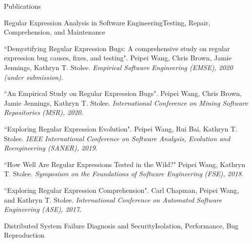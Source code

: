 \documentclass{professional} %
\begin{document}
\begin{rSection}{Publications} 
\begin{rSubsection}{Regular Expression Analysis in Software Engineering}{Testing, Repair, Comprehension, and Maintenance} \\

\item ``Demystifying Regular Expression Bugs: A comprehensive study on regular expression bug causes, fixes, and testing". Peipei Wang, Chris Brown, Jamie Jennings, Kathryn T. Stolee. \textit{Empirical Software Engineering (EMSE), 2020 (under submission)}.

\item ``An Empirical Study on Regular Expression Bugs". Peipei Wang, Chris Brown, Jamie Jennings, Kathryn T. Stolee. \textit{International Conference on Mining Software Repositories (MSR), 2020}. \href{https://dl.acm.org/doi/abs/10.1145/3379597.3387464}{}%

\item ``Exploring Regular Expression Evolution". Peipei Wang, Rui Bai, Kathryn T. Stolee. \textit{IEEE International Conference on Software Analysis, Evolution and Reengineering (SANER), 2019}. \href{https://ieeexplore.ieee.org/stamp/stamp.jsp?arnumber=8667972}{}%

\item ``How Well Are Regular Expressions Tested in the Wild?" Peipei Wang, Kathryn T. Stolee. \textit{Symposium on the Foundations of Software Engineering (FSE), 2018}. \href{https://dl.acm.org/doi/pdf/10.1145/3236024.3236072}{}%

\item ``Exploring Regular Expression Comprehension". Carl Chapman, Peipei Wang, and Kathryn T. Stolee. \textit{International Conference on Automated Software Engineering (ASE), 2017}. \href{https://ieeexplore.ieee.org/stamp/stamp.jsp?arnumber=8115653}{}
\end{rSubsection}
\begin{rSubsection}{Distributed System Failure Diagnosis and Security}{Isolation, Performance, Bug Reproduction} \\


\end{rSubsection}
\end{rSection}
\end{document}
